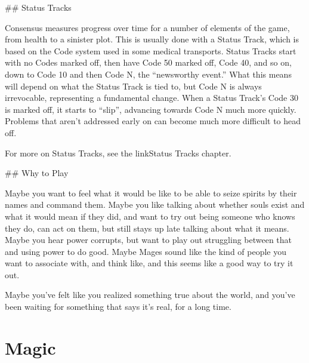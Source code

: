 \documentclass[
  oneside,
  statementpaper,
  9pt]{memoir}
\begin{document}
\begin{Narrator}

## Status Tracks

Consensus measures progress over time for a number of elements of the game, from health to a sinister plot. This is usually done with a Status Track, which is based on the Code system used in some medical transports. Status Tracks start with no Codes marked off, then have Code 50 marked off, Code 40, and so on, down to Code 10 and then Code N, the “newsworthy event.” What this means will depend on what the Status Track is tied to, but Code N is always irrevocable, representing a fundamental change. When a Status Track’s Code 30 is marked off, it starts to “slip”, advancing towards Code N much more quickly. Problems that aren’t addressed early on can become much more difficult to head off.

For more on Status Tracks, see the {{linkStatus Tracks chapter}}.



## Why to Play

Maybe you want to feel what it would be like to be able to seize spirits by their names and command them. Maybe you like talking about whether souls exist and what it would mean if they did, and want to try out being someone who knows they do, can act on them, but still stays up late talking about what it means. Maybe you hear power corrupts, but want to play out struggling between that and using power to do good. Maybe Mages sound like the kind of people you want to associate with, and think like, and this seems like a good way to try it out.

Maybe you’ve felt like you realized something true about the world, and you’ve been waiting for something that says it’s real, for a long time.

\end{Narrator}

\newpage

\label{Magic Chapter}

\hypertarget{magic}{%
\chapter{Magic}\label{magic}}
\end{document}
